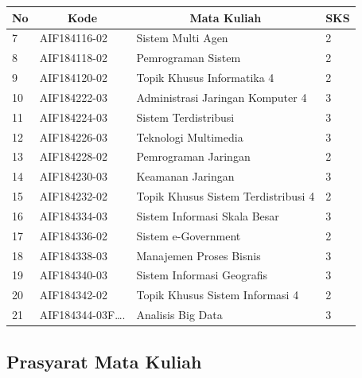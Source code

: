 \begin{table}[H]
	\centering
		\begin{tabular}{|p{0.5cm}|p{2.85cm}|p{4.95cm}|p{2.7cm}|}
			\hline
			\multicolumn{1}{|c|}{\textbf{No}} & \multicolumn{1}{c|}{\textbf{Kode}} & \multicolumn{1}{c|}{\textbf{Mata Kuliah}} & \multicolumn{1}{c|}{\textbf{SKS}} \\ \hline
7   & AIF184116-02    & Sistem Multi Agen                          & 2   \\ \hline
8   & AIF184118-02    & Pemrograman Sistem                         & 2   \\ \hline
9   & AIF184120-02    & Topik Khusus Informatika 4                 & 2   \\ \hline
10  & AIF184222-03    & Administrasi Jaringan Komputer 4           & 3   \\ \hline
11  & AIF184224-03    & Sistem Terdistribusi                       & 3   \\ \hline
12  & AIF184226-03    & Teknologi Multimedia                       & 3   \\ \hline
13  & AIF184228-02    & Pemrograman Jaringan                       & 2   \\ \hline
14  & AIF184230-03    & Keamanan Jaringan                          & 3   \\ \hline
15  & AIF184232-02    & Topik Khusus Sistem Terdistribusi 4        & 2   \\ \hline
16  & AIF184334-03    & Sistem Informasi Skala Besar               & 3   \\ \hline
17  & AIF184336-02    & Sistem e-Government                        & 2   \\ \hline
18  & AIF184338-03    & Manajemen Proses Bisnis                    & 3   \\ \hline
19  & AIF184340-03    & Sistem Informasi Geografis                 & 3   \\ \hline
20  & AIF184342-02    & Topik Khusus Sistem Informasi 4            & 2   \\ \hline
21  & AIF184344-03F…. & Analisis Big Data                          & 3   \\ \hline
		\end{tabular}
	\label{tab:kuliahpilihan_3}
\end{table}

\subsection{Prasyarat Mata Kuliah}

